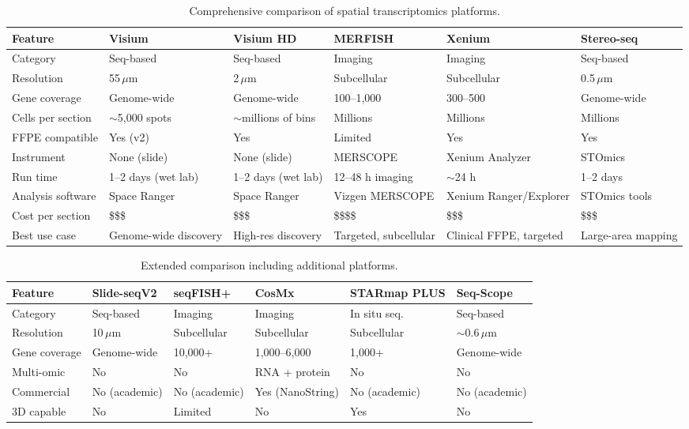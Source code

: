 \begin{table}[htbp]
\centering
\caption{Comprehensive comparison of spatial transcriptomics platforms.}
\label{tab:spatial:platforms}
\footnotesize
\begin{tabularx}{\textwidth}{lXXXXX}
\toprule
\textbf{Feature} & \textbf{Visium} & \textbf{Visium HD} & \textbf{MERFISH} & \textbf{Xenium} & \textbf{Stereo-seq} \\
\midrule
Category & Seq-based & Seq-based & Imaging & Imaging & Seq-based \\
Resolution & 55\,$\mu$m & 2\,$\mu$m & Subcellular & Subcellular & 0.5\,$\mu$m \\
Gene coverage & Genome-wide & Genome-wide & 100--1,000 & 300--500 & Genome-wide \\
Cells per section & $\sim$5,000 spots & $\sim$millions of bins & Millions & Millions & Millions \\
FFPE compatible & Yes (v2) & Yes & Limited & Yes & Yes \\
Instrument & None (slide) & None (slide) & MERSCOPE & Xenium Analyzer & STOmics \\
Run time & 1--2 days (wet lab) & 1--2 days (wet lab) & 12--48 h imaging & $\sim$24 h & 1--2 days \\
Analysis software & Space Ranger & Space Ranger & Vizgen MERSCOPE & Xenium Ranger/Explorer & STOmics tools \\
Cost per section & \$\$\$ & \$\$\$ & \$\$\$\$ & \$\$\$ & \$\$\$ \\
Best use case & Genome-wide discovery & High-res discovery & Targeted, subcellular & Clinical FFPE, targeted & Large-area mapping \\
\bottomrule
\end{tabularx}
\end{table}

\begin{table}[htbp]
\centering
\caption{Extended comparison including additional platforms.}
\label{tab:spatial:platforms_extended}
\footnotesize
\begin{tabularx}{\textwidth}{lXXXXX}
\toprule
\textbf{Feature} & \textbf{Slide-seqV2} & \textbf{seqFISH+} & \textbf{CosMx} & \textbf{STARmap PLUS} & \textbf{Seq-Scope} \\
\midrule
Category & Seq-based & Imaging & Imaging & In situ seq. & Seq-based \\
Resolution & 10\,$\mu$m & Subcellular & Subcellular & Subcellular & $\sim$0.6\,$\mu$m \\
Gene coverage & Genome-wide & 10,000+ & 1,000--6,000 & 1,000+ & Genome-wide \\
Multi-omic & No & No & RNA + protein & No & No \\
Commercial & No (academic) & No (academic) & Yes (NanoString) & No (academic) & No (academic) \\
3D capable & No & Limited & No & Yes & No \\
\bottomrule
\end{tabularx}
\end{table}

